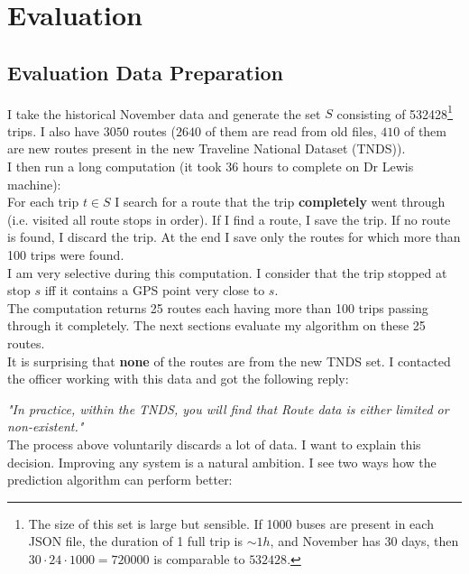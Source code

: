 \documentclass[12pt,a4paper,oneside,openright]{report}
\begin{document}
\chapter{Evaluation}

\section{Evaluation Data Preparation}


I take the historical November data and generate the set $S$ consisting of 532428\footnote{
The size of this set is large but sensible. If 1000 buses are present in each JSON file,
the duration of 1 full trip is $\sim1h$, and November has 30 days, 
then $30 \cdot 24 \cdot 1000 = 720000$ is comparable to $532428$.} trips. I also have $3050$ routes
($2640$ of them are read from old files, $410$ of them are new routes present
in the new Traveline National Dataset (TNDS)). \\

I then run a long computation (it took 36 hours to complete on Dr Lewis machine): \\

For each trip $t \in S$ I search for a route that the trip \textbf{completely}
went through (i.e. visited all route stops in order). If I find a route, I save the trip. If no route is found, I discard the
trip. At the end I save only the routes for which more than 100 trips 
were found. \\

I am very selective during this computation. I consider that the trip stopped
at stop $s$ iff it contains a GPS point very close to $s$. \\



The computation returns 25 routes each having more than 100 trips passing through it completely. The next
sections evaluate my algorithm on these 25 routes. \\

It is surprising that \textbf{none} of the routes are from the new TNDS set. I contacted the officer
working with this data and got the following reply:

\textit{"In practice, within the TNDS, you will find that Route data is either limited or
non-existent."} \\

The process above voluntarily discards a lot of data. I want to explain this decision.
Improving any system is a natural ambition. I see two ways how the prediction algorithm can
perform better:
\end{document}
